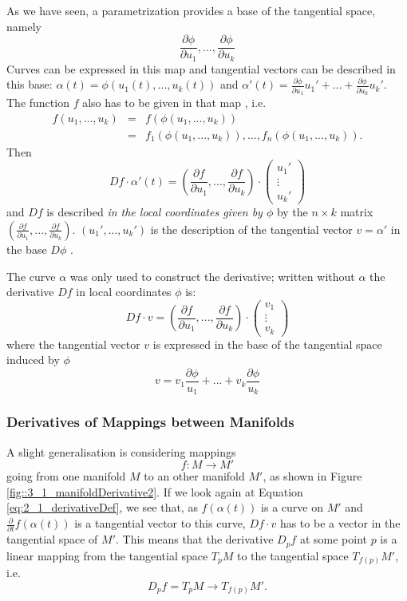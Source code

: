 As we have seen, a parametrization provides a base of the tangential space, namely 
\[\frac{\partial\phi}{\partial u_1},..., \frac{\partial\phi}{\partial u_k}\] 
Curves can be expressed in this map and tangential vectors can be described in this base: $\alpha(t) = \phi(u_1(t),...,u_k(t))$ and $\alpha'(t) = \frac{\partial\phi}{\partial u_1} u_1' + ... + \frac{\partial\phi}{\partial u_k} u_k'$. The function $f$ also has to be given in that map , i.e. 
\begin{eqnarray*} f(u_1,...,u_k) &=& f(\phi(u_1,...,u_k)) \\
 &=& f_1(\phi(u_1,...,u_k)),...,f_n(\phi(u_1,...,u_k)). \end{eqnarray*} 
Then 
\[Df \cdot \alpha'(t) = (\frac{\partial f}{\partial u_1},..., \frac{\partial f}{\partial u_k}) \cdot \begin{pmatrix}
	u_1' \\ \vdots \\ u_k'\end{pmatrix}\]
and $Df$ is described \emph{in the local coordinates given by $\phi$} by the $ n \times k$ matrix $(\frac{\partial f}{\partial u_1},..., \frac{\partial f}{\partial u_k})$. $(u_1',...,u_k')$ is the description of the tangential vector $v = \alpha'$ in the base $D\phi$ . 

The curve $\alpha$ was only used to construct the derivative; written without $\alpha$ the derivative $Df$ in local coordinates $\phi$ is:
\[Df \cdot v = (\frac{\partial f}{\partial u_1},..., \frac{\partial f}{\partial u_k}) \cdot \begin{pmatrix}
	v_1 \\ \vdots \\ v_k\end{pmatrix}\]
where the tangential vector $v$ is expressed in the base of the tangential space induced by $\phi$
\[v = v_1 \frac{\partial \phi}{u_1} +...+ v_k \frac{\partial \phi}{u_k}\] 
\subsubsection*{Derivatives of Mappings between Manifolds}
\label{sec:derivativeBetweenMfs}
A slight generalisation is considering mappings 
\[f:M\to M'\]
going from one manifold $M$ to an other manifold $M'$, as shown in Figure \ref{fig::3_1_manifoldDerivative2}. If we look again at Equation \ref{eq:2_1_derivativeDef}, we see that, as $f(\alpha(t))$ is a curve on $M'$ and $\frac{\partial}{\partial t}f(\alpha(t))$ is a tangential vector to this curve, $Df\cdot v$ has to be a vector in the tangential space of $M'$. This means that the derivative $D_pf$ at some point $p$ is a linear mapping from the tangential space $T_pM$  to the tangential space $T_{f(p)} M'$, i.e. 
\[D_p f = T_p M \rightarrow T_{f(p)} M'.\] 


